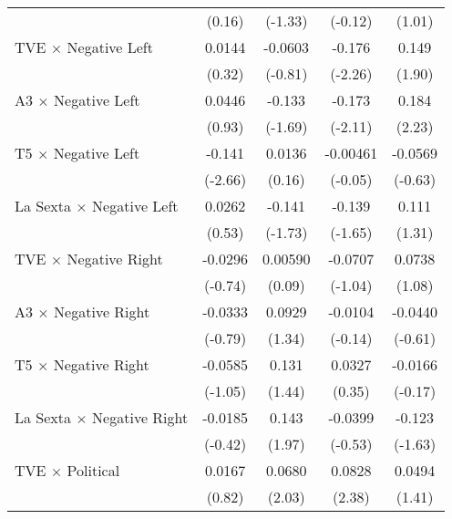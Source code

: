 {\begin{tabular}{l*{4}{c}}
                &   (0.16)         &  (-1.33)         &  (-0.12)         &   (1.01)         \\
TVE $\times$ Negative Left&   0.0144         &  -0.0603         &   -0.176\sym{*}  &    0.149         \\
                &   (0.32)         &  (-0.81)         &  (-2.26)         &   (1.90)         \\
A3 $\times$ Negative Left&   0.0446         &   -0.133         &   -0.173\sym{*}  &    0.184\sym{*}  \\
                &   (0.93)         &  (-1.69)         &  (-2.11)         &   (2.23)         \\
T5 $\times$ Negative Left&   -0.141\sym{**} &   0.0136         & -0.00461         &  -0.0569         \\
                &  (-2.66)         &   (0.16)         &  (-0.05)         &  (-0.63)         \\
La Sexta $\times$ Negative Left&   0.0262         &   -0.141         &   -0.139         &    0.111         \\
                &   (0.53)         &  (-1.73)         &  (-1.65)         &   (1.31)         \\
TVE $\times$ Negative Right&  -0.0296         &  0.00590         &  -0.0707         &   0.0738         \\
                &  (-0.74)         &   (0.09)         &  (-1.04)         &   (1.08)         \\
A3 $\times$ Negative Right&  -0.0333         &   0.0929         &  -0.0104         &  -0.0440         \\
                &  (-0.79)         &   (1.34)         &  (-0.14)         &  (-0.61)         \\
T5 $\times$ Negative Right&  -0.0585         &    0.131         &   0.0327         &  -0.0166         \\
                &  (-1.05)         &   (1.44)         &   (0.35)         &  (-0.17)         \\
La Sexta $\times$ Negative Right&  -0.0185         &    0.143\sym{*}  &  -0.0399         &   -0.123         \\
                &  (-0.42)         &   (1.97)         &  (-0.53)         &  (-1.63)         \\
TVE $\times$ Political&   0.0167         &   0.0680\sym{*}  &   0.0828\sym{*}  &   0.0494         \\
                &   (0.82)         &   (2.03)         &   (2.38)         &   (1.41)         \\

\end{tabular}}
